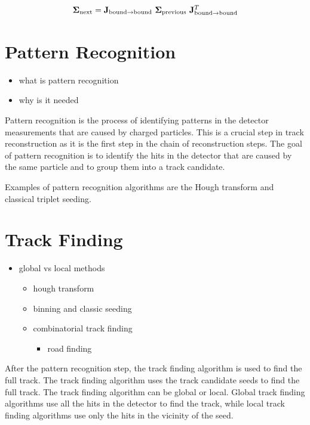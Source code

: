 \begin{equation}
    \mathbf{\Sigma}_{\text{next}} = \mathbf{J}_{\text{bound\textrightarrow bound}} \ \mathbf{\Sigma}_{\text{previous}} \ \mathbf{J}_{\text{bound\textrightarrow bound}}^T
\end{equation}

\section{Pattern Recognition}

\begin{itemize}
    \color{red}
    \item what is pattern recognition
    \item why is it needed
\end{itemize}

Pattern recognition is the process of identifying patterns in the detector measurements that are caused by charged particles. This is a crucial step in track reconstruction as it is the first step in the chain of reconstruction steps. The goal of pattern recognition is to identify the hits in the detector that are caused by the same particle and to group them into a track candidate.

Examples of pattern recognition algorithms are the Hough transform and classical triplet seeding.

\section{Track Finding}

\begin{itemize}
    \color{red}
    \item global vs local methods
    \begin{itemize}
        \item hough transform
        \item binning and classic seeding
        \item combinatorial track finding
        \begin{itemize}
            \item road finding
        \end{itemize}
    \end{itemize}
\end{itemize}

After the pattern recognition step, the track finding algorithm is used to find the full track. The track finding algorithm uses the track candidate seeds to find the full track. The track finding algorithm can be global or local. Global track finding algorithms use all the hits in the detector to find the track, while local track finding algorithms use only the hits in the vicinity of the seed.

